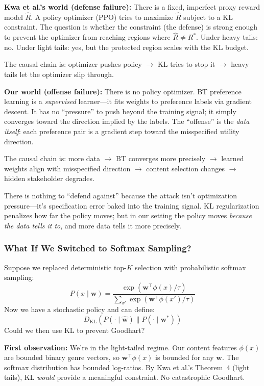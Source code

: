 \documentclass[11pt]{article}
\begin{document}
\textbf{Kwa et al.'s world (defense failure):} There is a fixed,
imperfect proxy reward model $\hat{R}$. A policy optimizer (PPO) tries
to maximize $\hat{R}$ subject to a KL constraint. The question is
whether the constraint (the defense) is strong enough to prevent the
optimizer from reaching regions where $\hat{R} \neq R^*$. Under heavy
tails: no. Under light tails: yes, but the protected region scales
with the KL budget.

The causal chain is: optimizer pushes policy $\to$ KL tries to stop it
$\to$ heavy tails let the optimizer slip through.

\textbf{Our world (offense failure):} There is no policy optimizer. BT
preference learning is a \emph{supervised} learner---it fits weights to
preference labels via gradient descent. It has no ``pressure'' to push
beyond the training signal; it simply converges toward the direction
implied by the labels. The ``offense'' is the \emph{data itself}: each
preference pair is a gradient step toward the misspecified utility
direction.

The causal chain is: more data $\to$ BT converges more precisely $\to$
learned weights align with misspecified direction $\to$ content
selection changes $\to$ hidden stakeholder degrades.

There is nothing to ``defend against'' because the attack isn't
optimization pressure---it's specification error baked into the training
signal. KL regularization penalizes how far the policy moves; but in our
setting the policy moves \emph{because the data tells it to}, and more
data tells it more precisely.

\subsubsection*{What If We Switched to Softmax Sampling?}

Suppose we replaced deterministic top-$K$ selection with probabilistic
softmax sampling:
\begin{equation}
  P(x \mid \mathbf{w}) = \frac{\exp(\mathbf{w}^\top \phi(x) / \tau)}
    {\sum_{x'} \exp(\mathbf{w}^\top \phi(x') / \tau)}
\end{equation}
Now we have a stochastic policy and can define:
\begin{equation}
  D_{\text{KL}}(P(\cdot \mid \hat{\mathbf{w}}) \| P(\cdot \mid
  \mathbf{w}^*))
\end{equation}
Could we then use KL to prevent Goodhart?

\textbf{First observation:} We're in the light-tailed regime.
Our content features $\phi(x)$ are bounded binary genre vectors, so
$\mathbf{w}^\top \phi(x)$ is bounded for any $\mathbf{w}$. The softmax
distribution has bounded log-ratios. By Kwa et al.'s Theorem~4 (light
tails), KL \emph{would} provide a meaningful constraint. No catastrophic
Goodhart.
\end{document}
